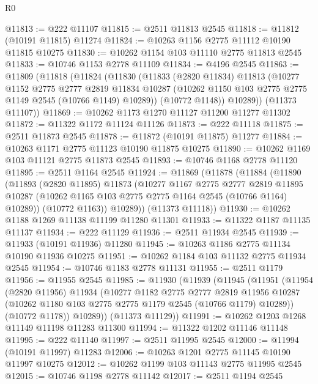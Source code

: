 \begin{lexlean}{R0}
\begin{coremodule}
@11813 := @222 @11107
@11815 := @2511 @11813 @2545
@11818 := @11812 (@10191 @11815) @11274
@11824 := @10263 @1156 @2775 @11112 @10190 @11815 @10275
@11830 := @10262 @1154 @103 @11110 @2775 @11813 @2545
@11833 := @10746 @1153 @2778 @11109
@11834 := @4196 @2545
@11863 := @11809
    (@11818
      (@11824
        (@11830
          (@11833
            (@2820 @11834)
            @11813
            (@10277
              @1152
              @2775
              @2777
              @2819
              @11834
              @10287
              (@10262 @1150 @103 @2775 @2775 @1149 @2545 (@10766 @1149) @10289))
            (@10772 @1148))
          @10289))
      (@11373 @11107))
@11869 := @10262 @1173 @1270 @11127 @11200 @11277 @11302
@11872 := @11322 @1172 @11124 @11126
@11873 := @222 @11118
@11875 := @2511 @11873 @2545
@11878 := @11872 (@10191 @11875) @11277
@11884 := @10263 @1171 @2775 @11123 @10190 @11875 @10275
@11890 := @10262 @1169 @103 @11121 @2775 @11873 @2545
@11893 := @10746 @1168 @2778 @11120
@11895 := @2511 @1164 @2545
@11924 := @11869
    (@11878
      (@11884
        (@11890
          (@11893
            (@2820 @11895)
            @11873
            (@10277
              @1167
              @2775
              @2777
              @2819
              @11895
              @10287
              (@10262 @1165 @103 @2775 @2775 @1164 @2545 (@10766 @1164) @10289))
            (@10772 @1163))
          @10289))
      (@11373 @11118))
@11930 := @10262 @1188 @1269 @11138 @11199 @11280 @11301
@11933 := @11322 @1187 @11135 @11137
@11934 := @222 @11129
@11936 := @2511 @11934 @2545
@11939 := @11933 (@10191 @11936) @11280
@11945 := @10263 @1186 @2775 @11134 @10190 @11936 @10275
@11951 := @10262 @1184 @103 @11132 @2775 @11934 @2545
@11954 := @10746 @1183 @2778 @11131
@11955 := @2511 @1179
@11956 := @11955 @2545
@11985 := @11930
    (@11939
      (@11945
        (@11951
          (@11954
            (@2820 @11956)
            @11934
            (@10277
              @1182
              @2775
              @2777
              @2819
              @11956
              @10287
              (@10262 @1180 @103 @2775 @2775 @1179 @2545 (@10766 @1179) @10289))
            (@10772 @1178))
          @10289))
      (@11373 @11129))
@11991 := @10262 @1203 @1268 @11149 @11198 @11283 @11300
@11994 := @11322 @1202 @11146 @11148
@11995 := @222 @11140
@11997 := @2511 @11995 @2545
@12000 := @11994 (@10191 @11997) @11283
@12006 := @10263 @1201 @2775 @11145 @10190 @11997 @10275
@12012 := @10262 @1199 @103 @11143 @2775 @11995 @2545
@12015 := @10746 @1198 @2778 @11142
@12017 := @2511 @1194 @2545

\end{coremodule}
\end{lexlean}
